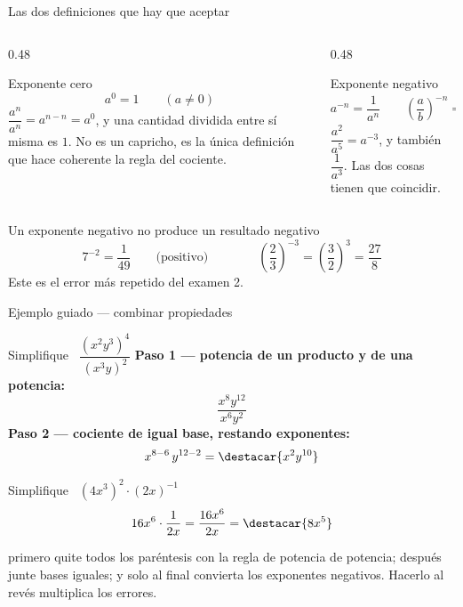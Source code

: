 \documentclass[aspectratio=169,10pt]{beamer}
\begin{document}
\begin{frame}{Las dos definiciones que hay que aceptar}
  \scriptsize
  \begin{columns}[T,onlytextwidth]
    \begin{column}{0.48\textwidth}
      \begin{block}{Exponente cero}
        \tiny
        \[ a^{0} = 1 \qquad (a\neq 0) \]
         $\dfrac{a^{n}}{a^{n}} = a^{n-n} = a^{0}$, y una
        cantidad dividida entre sí misma es $1$. No es un capricho, es la
        única definición que hace coherente la regla del cociente.
      \end{block}
    \end{column}
    \begin{column}{0.48\textwidth}
      \begin{block}{Exponente negativo}
        \tiny
        \[ a^{-n} = \frac{1}{a^{n}}
           \qquad
           \left(\frac{a}{b}\right)^{-n}
           = \left(\frac{b}{a}\right)^{n} \]
         $\dfrac{a^{2}}{a^{5}} = a^{-3}$, y también
        $\dfrac{1}{a^{3}}$. Las dos cosas tienen que coincidir.
      \end{block}
    \end{column}
  \end{columns}

  \vspace{0.12cm}
  \begin{alertblock}{Un exponente negativo no produce un resultado negativo}
    \tiny
    \[ 7^{-2} = \frac{1}{49} \qquad\text{(positivo)}
       \qquad\qquad
       \left(\frac{2}{3}\right)^{-3}
       = \left(\frac{3}{2}\right)^{3} = \frac{27}{8} \]
     Este es el error más repetido del examen 2.
  \end{alertblock}
\end{frame}

\begin{frame}{Ejemplo guiado — combinar propiedades}
  \scriptsize
  \begin{exampleblock}{Simplifique \ $\dfrac{(x^{2}y^{3})^{4}}{(x^{3}y)^{2}}$}
    \tiny
    \textbf{Paso 1 — potencia de un producto y de una potencia:}
    \[ \frac{x^{8}y^{12}}{x^{6}y^{2}} \]
    \textbf{Paso 2 — cociente de igual base, restando exponentes:}
    \[ x^{8-6}\,y^{12-2} = \destacar{x^{2}y^{10}} \]
  \end{exampleblock}

  \vspace{0.1cm}
  \begin{exampleblock}{Simplifique \ $(4x^{3})^{2}\cdot(2x)^{-1}$}
    \tiny
    \[ 16x^{6}\cdot\frac{1}{2x}
     = \frac{16x^{6}}{2x} = \destacar{8x^{5}} \]
  \end{exampleblock}

  \vspace{0.06cm}
  {\tiny\color{uniGris}  primero quite todos los
  paréntesis con la regla de potencia de potencia; después junte bases
  iguales; y solo al final convierta los exponentes negativos. Hacerlo al
  revés multiplica los errores.}
\end{frame}
\end{document}
